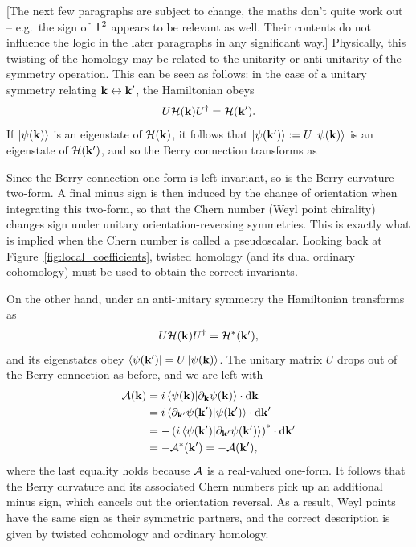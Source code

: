 {\color{red}
[The next few paragraphs are subject to change, the maths don't quite work out -- e.g.\ the sign of $\mathsf{T}^2$ appears to be relevant as well. Their contents do not influence the logic in the later paragraphs in any significant way.] Physically, this twisting of the homology may be related to the unitarity or anti-unitarity of the symmetry operation. This can be seen as follows: in the case of a unitary symmetry relating $\vb{k}\leftrightarrow\vb{k}'$, the Hamiltonian obeys
\begin{equation*}
	U\mathcal{H}(\vb{k})U^\dag = \mathcal{H}(\vb{k}').
\end{equation*}
If $\ket{\psi(\vb{k})}$ is an eigenstate of $\mathcal{H}(\vb{k})$, it follows that $\ket{\psi(\vb{k}')}:=U\ket{\psi(\vb{k})}$ is an eigenstate of $\mathcal{H}(\vb{k}')$, and so the Berry connection transforms as
Since the Berry connection one-form is left invariant, so is the Berry curvature two-form. A final minus sign is then induced by the change of orientation when integrating this two-form, so that the Chern number (Weyl point chirality) changes sign under unitary orientation-reversing symmetries. This is exactly what is implied when the Chern number is called a pseudoscalar. Looking back at Figure~\ref{fig:local_coefficients}, twisted homology (and its dual ordinary cohomology) must be used to obtain the correct invariants.

On the other hand, under an anti-unitary symmetry the Hamiltonian transforms as \red{[for $\TRS^2=-1$]}
\begin{equation*}
	U\mathcal{H}(\vb{k})U^\dag = \mathcal{H}^*(\vb{k}'),
\end{equation*}
and its eigenstates obey $\bra{\psi(\vb{k}')} = U\ket{\psi(\vb{k})}$. The unitary matrix $U$ drops out of the Berry connection as before, and we are left with
\begin{align*}
	\mathcal{A}(\vb{k}) &= i\braket{\psi(\vb{k}) | \partial_{\vb{k}}\psi(\vb{k})}\cdot\dd{\vb{k}} \\
		&= i\braket{\partial_{\vb{k}'}\psi(\vb{k}') | \psi(\vb{k}')}\cdot\dd{\vb{k}'} \\
		&= -\left(i\braket{\psi(\vb{k}') | \partial_{\vb{k}'}\psi(\vb{k}')}\right)^*\cdot\dd{\vb{k}'} \\
		&= -\mathcal{A}^*(\vb{k}') = -\mathcal{A}(\vb{k}'),
\end{align*}
where the last equality holds because $\mathcal{A}$ is a real-valued one-form. It follows that the Berry curvature and its associated Chern numbers pick up an additional minus sign, which cancels out the orientation reversal. As a result, Weyl points have the same sign as their symmetric partners, and the correct description is given by twisted cohomology and ordinary homology.
}

